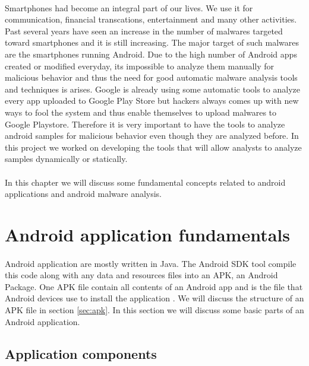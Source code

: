\documentclass[../main.tex]{subfile}
\begin{document}
	\paragraph{} Smartphones had become an integral part of our lives. We use it for communication, financial transcations, entertainment and many other activities. Past several years have seen an increase in the number of malwares targeted toward smartphones and it is still increasing. The major target of such malwares are the smartphones running Android. Due to the high number of Android apps created or modified everyday, its impossible to analyze them manually for malicious behavior and thus the need for good automatic malware analysis tools and techniques is arises. Google is already using some automatic tools to analyze every app uploaded to Google Play Store but hackers always comes up with new ways to fool the system and thus enable themselves to upload malwares to Google Playstore. Therefore it is very important to have the tools to analyze android samples for malicious behavior even though they are analyzed before. In this project we worked on developing the tools that will allow analysts to analyze samples dynamically or statically.
	\paragraph{} In this chapter we will discuss some fundamental concepts related to android applications and android malware analysis.
	
	\section{Android application fundamentals}\label{sec:app_fundamentals}
		\paragraph{} Android application are mostly written in Java. The Android SDK tool compile this code along with any data and resources files into an APK, an Android Package. One APK file contain all contents of an Android app and is the file that Android devices use to install the application \cite{app_fundamentals}. We will discuss the structure of an APK file in section \ref{sec:apk}. In this section we will discuss some basic parts of an Android application.
		
		\subsection{Application components}
\end{document}
